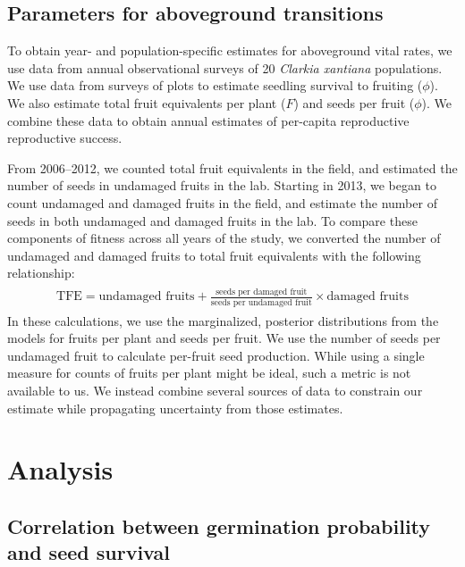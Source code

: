 \documentclass[12pt, oneside, titlepage]{article}   	%
\begin{document}
\subsection{Parameters for aboveground transitions}

To obtain year- and population-specific estimates for aboveground vital rates, we use data from annual observational surveys of 20 \textit{Clarkia xantiana} populations. We use data from surveys of plots to estimate seedling survival to fruiting ($\phi$). We also estimate total fruit equivalents per plant ($F$) and seeds per fruit ($\phi$). We combine these data to obtain annual estimates of per-capita reproductive reproductive success.

From 2006--2012, we counted total fruit equivalents in the field, and estimated the number of seeds in undamaged fruits in the lab. Starting in 2013, we began to count undamaged and damaged fruits in the field, and estimate the number of seeds in both undamaged and damaged fruits in the lab. To compare these components of fitness across all years of the study, we converted the number of undamaged and damaged fruits to total fruit equivalents with the following relationship:
%
    \begin{align}
\begin{split}
\textrm{TFE} = \textrm{undamaged fruits} + \frac{\textrm{seeds per damaged fruit}}{\textrm{seeds per undamaged fruit}}\times  \textrm{damaged fruits} 
  \end{split}
\end{align}
%
In these calculations, we use the marginalized, posterior distributions from the models for fruits per plant and seeds per fruit. We use the number of seeds per undamaged fruit to calculate per-fruit seed production. While using a single measure for counts of fruits per plant might be ideal, such a metric is not available to us. We instead combine several sources of data to constrain our estimate while propagating uncertainty from those estimates. 

\section{Analysis}

\subsection{Correlation between germination probability and seed survival}
\end{document}
